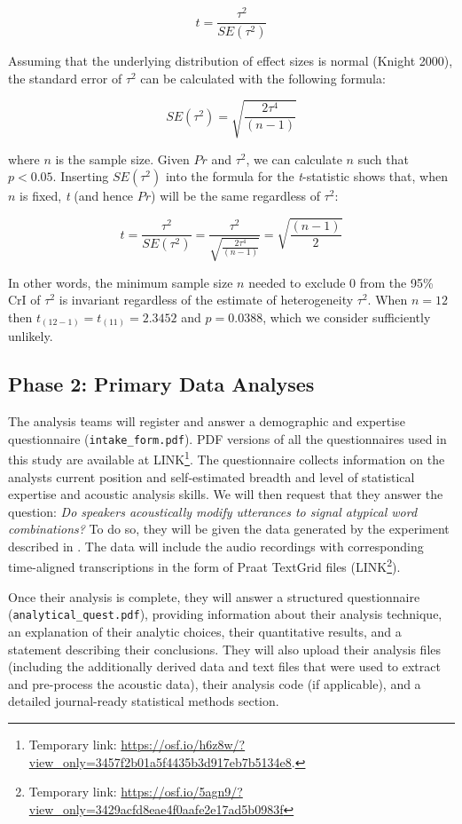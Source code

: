 \documentclass[
  12pt,
]{article}
\begin{document}
\[t = \frac{\tau^2}{SE(\tau^2)}\]

Assuming that the underlying distribution of effect sizes is normal (Knight 2000), the standard error of \(\tau^2\) can be calculated with the following formula:

\[SE(\tau^2) = \sqrt{\frac{2\tau^4}{(n-1)}}\]

where \(n\) is the sample size.
Given \(Pr\) and \(\tau^2\), we can calculate \(n\) such that \(p < 0.05\).
Inserting \(SE(\tau^2)\) into the formula for the \emph{t}-statistic shows that, when \(n\) is fixed, \emph{t} (and hence \(Pr\)) will be the same regardless of \(\tau^2\):

\[t = \frac{\tau^2}{SE(\tau^2)} = \frac{\tau^2}{\sqrt{\frac{2\tau^4}{(n-1)}}} = \sqrt{\frac{(n-1)}{2}}\]

In other words, the minimum sample size \(n\) needed to exclude 0 from the 95\% CrI of \(\tau^2\) is invariant regardless of the estimate of heterogeneity \(\tau^2\).
When \(n = 12\) then \(t_{(12-1)} = t_{(11)} = 2.3452\) and \(p = 0.0388\), which we consider sufficiently unlikely.

\hypertarget{phase-2-primary-data-analyses}{%
\subsection{Phase 2: Primary Data Analyses}\label{phase-2-primary-data-analyses}}

The analysis teams will register and answer a demographic and expertise questionnaire (\texttt{intake\_form.pdf}).
PDF versions of all the questionnaires used in this study are available at LINK\footnote{Temporary link: \url{https://osf.io/h6z8w/?view_only=3457f2b01a5f4435b3d917eb7b5134e8}.}.
The questionnaire collects information on the analysts current position and self-estimated breadth and level of statistical expertise and acoustic analysis skills.
We will then request that they answer the question: \emph{Do speakers acoustically modify utterances to signal atypical word combinations?}
To do so, they will be given the data generated by the experiment described in .
The data will include the audio recordings with corresponding time-aligned transcriptions in the form of Praat TextGrid files (LINK\footnote{Temporary link: \url{https://osf.io/5agn9/?view_only=3429acfd8eae4f0aafe2e17ad5b0983f}}).

Once their analysis is complete, they will answer a structured questionnaire (\texttt{analytical\_quest.pdf}), providing information about their analysis technique, an explanation of their analytic choices, their quantitative results, and a statement describing their conclusions.
They will also upload their analysis files (including the additionally derived data and text files that were used to extract and pre-process the acoustic data), their analysis code (if applicable), and a detailed journal-ready statistical methods section.
\end{document}
